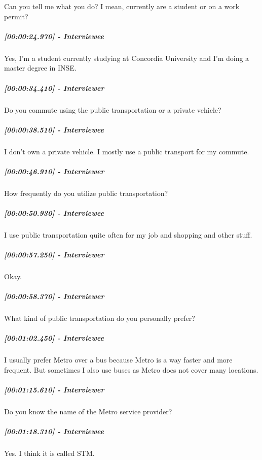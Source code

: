 \documentclass[a4paper,12pt]{article}
\begin{document}
Can you tell me what you do? I mean, currently are a student or on a
work permit?

\hypertarget{interviewee-1}{%
\subparagraph{{[}00:00:24.970{]} - Interviewee}\label{interviewee-1}}

Yes, I'm a student currently studying at Concordia University and I'm
doing a master degree in INSE.

\hypertarget{interviewer-2}{%
\subparagraph{{[}00:00:34.410{]} - Interviewer}\label{interviewer-2}}

Do you commute using the public transportation or a private vehicle?

\hypertarget{interviewee-2}{%
\subparagraph{{[}00:00:38.510{]} - Interviewee}\label{interviewee-2}}

I don't own a private vehicle. I mostly use a public transport for my
commute.

\hypertarget{interviewer-3}{%
\subparagraph{{[}00:00:46.910{]} - Interviewer}\label{interviewer-3}}

How frequently do you utilize public transportation?

\hypertarget{interviewee-3}{%
\subparagraph{{[}00:00:50.930{]} - Interviewee}\label{interviewee-3}}

I use public transportation quite often for my job and shopping and
other stuff.

\hypertarget{interviewer-4}{%
\subparagraph{{[}00:00:57.250{]} - Interviewer}\label{interviewer-4}}

Okay.

\hypertarget{interviewer-5}{%
\subparagraph{{[}00:00:58.370{]} - Interviewer}\label{interviewer-5}}

What kind of public transportation do you personally prefer?

\hypertarget{interviewee-4}{%
\subparagraph{{[}00:01:02.450{]} - Interviewee}\label{interviewee-4}}

I usually prefer Metro over a bus because Metro is a way faster and more
frequent. But sometimes I also use buses as Metro does not cover many
locations.

\hypertarget{interviewer-6}{%
\subparagraph{{[}00:01:15.610{]} - Interviewer}\label{interviewer-6}}

Do you know the name of the Metro service provider?

\hypertarget{interviewee-5}{%
\subparagraph{{[}00:01:18.310{]} - Interviewee}\label{interviewee-5}}

Yes. I think it is called STM.
\end{document}
